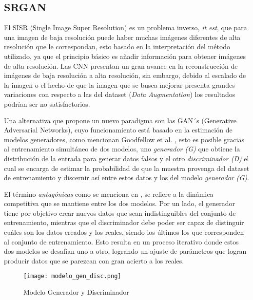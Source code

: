 \subsection{SRGAN}

El SISR (Single Image Super Resolution) es un problema inverso, \emph{it est}, que para una imagen de baja resolución puede haber muchas
imágenes diferentes de alta resolución que le correspondan, esto basado en la interpretación del método utilizado, ya que
el principio básico es añadir información para obtener imágenes de alta resolución.
Las CNN presentan un gran avance en la reconstrucción de imágenes de baja resolución a alta resolución,
sin embargo, debido al escalado de la imagen o el hecho de que la imagen que se busca mejorar presenta grandes
variaciones con respecto a las del dataset (\emph{Data Augmentation}) los resultados podrían ser no satisfactorios.


Una alternativa que propone un nuevo paradigma son las GAN´s (Generative Adversarial Networks), cuyo funcionamiento está basado
en la estimación de modelos generadores, como mencionan Goodfellow et al. \cite{GANs}, esto es 
posible gracias al entrenamiento simultáneo de dos modelos, uno \emph{generador (G)} que obtiene 
la distribución de la entrada para generar datos falsos y el otro \emph{discriminador (D)} el cual se encarga de estimar 
la probabilidad de que la muestra provenga del dataset de entrenamiento y discernir así entre estos datos y 
los del modelo \emph{ generador (G)}.

El término \emph{antagónicas} como se menciona en \cite{SRGAN_Tesis}, se refiere a la dinámica 
competitiva que se mantiene entre los dos modelos. Por un lado,
el generador tiene por objetivo crear nuevos datos que sean indistinguibles del
conjunto de entrenamiento, mientras que el discriminador debe poder ser capaz
de distinguir cuáles son los datos creados y los reales, siendo los últimos los que corresponden
 al conjunto de entrenamiento. Esto resulta en un proceso iterativo donde estos dos modelos
 se desafían uno a otro, logrando un ajuste de parámetros
 que logran producir datos que se parezcan con gran acierto a los reales.
 

\begin{figure}[H]
    \begin{center}
      \texttt{[image: modelo\_gen\_disc.png]}
      \caption{Modelo Generador y Discriminador}
      \label{Alexis1}
    \end{center}
\end{figure}

